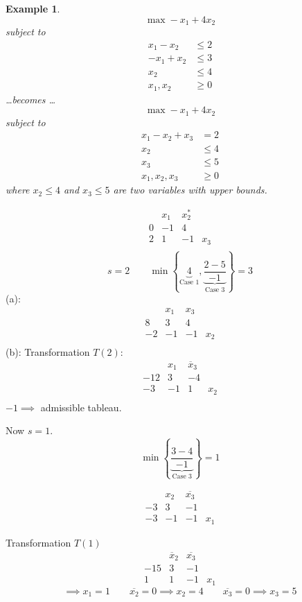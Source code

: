 \documentclass[a4paper]{article}
\numberwithin{lecref}{subsection}
\newcounter{exercises}
\newtheorem{example}[exercises]{Example}
\newcommand{\Set}[1]{\left\{#1\right\}}
\begin{document}
\begin{description}
		\begin{example}
			\[ \max -x_1 + 4x_2 \]
			subject to
			\begin{align*}
				x_1 - x_2 &\leq 2 \\
				-x_1 + x_2 &\leq 3 \\
				x_2 &\leq 4 \\
				x_1, x_2 &\geq 0
			\end{align*}
			\dots becomes \dots
			\[ \max -x_1 + 4x_2 \]
			subject to
			\begin{align*}
				x_1 - x_2 + x_3 &= 2 \\
				x_2 &\leq 4 \\
				x_3 &\leq 5 \\
				x_1, x_2, x_3 &\geq 0
			\end{align*}
			where $x_2 \leq 4$ and $x_3 \leq 5$ are two variables with upper bounds.
		\end{example}

		\begin{center}
			\[\begin{array}{c|ccc}
				  & x_1 & x_2^* & \\
				0 & -1 & 4 & \\
			\hline
				2 & 1 & -1 & x_3 \\
			\end{array}\]
			\[ s = 2 \qquad \min\Set{\underbrace{4}_{\text{Case 1}}, \underbrace{\frac{2 - 5}{-1}}_{\text{Case 3}}} = 3 \]
			(a):
			\[\begin{array}{c|ccc}
				  & x_1 & x_3 & \\
				8 & 3 & 4 & \\
			\hline
				-2 & -1 & -1 & x_2 \\
			\end{array}\]
			(b): Transformation $T(2)$:
			\[\begin{array}{c|ccc}
				  & x_1 & \overline x_3 \\
				-12 & 3 & -4 & \\
			\hline
				-3 & -1 & 1 & x_2 \\
			\end{array}\]
			$-1 \implies$ admissible tableau.

			Now $s = 1$.
			\[ \min\Set{\underbrace{\frac{3-4}{-1}}_{\text{Case 3}}} = 1 \]

			\[\begin{array}{c|ccc}
				   & x_2 & \overline{x_3} & \\
				-3 & 3 & -1 & \\
			\hline
				-3 & -1 & -1 & x_1
			\end{array}\]

			Transformation $T(1)$
			\[\begin{array}{c|ccc}
				    & \overline x_2 & \overline{x_3} & \\
				-15 & 3 & -1 & \\
			\hline
				1 & 1 & -1 & x_1
			\end{array}\]
			\[ \implies x_1 = 1 \qquad \overline{x_2} = 0 \implies x_2 = 4 \qquad \overline{x_3} = 0 \implies x_3 = 5 \]
		\end{center}
\end{description}
\end{document}
